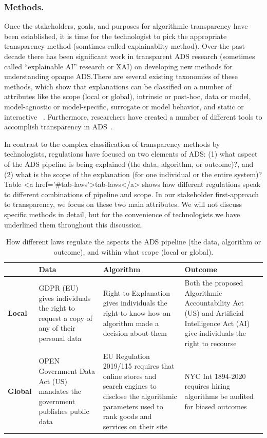 \subsubsection{Methods.}Once the stakeholders, goals, and purposes for algorithmic transparency have been established, it is time for the technologist to pick the appropriate transparency method (somtimes called explainablity method). Over the past decade there has been significant work in transparent ADS research (sometimes called ``explainable AI'' research or XAI) on developing new methods for understanding opaque ADS.There are several existing taxonomies of these methods, which show that explanations can be classified on a number of attributes like the scope (local or global), intrinsic or post-hoc, data or model, model-agnostic or model-specific, surrogate or model behavior, and static or interactive ~\cite{DBLP:journals/jmlr/AryaBCDHHHLLMMP20, molnar2019, DBLP:journals/corr/abs-2012-01805}. Furthermore, researchers have created a number of different tools to accomplish transparency in ADS~\cite{DBLP:conf/nips/LundbergL17, ribeiro2016should, datta2016algorithmic, DBLP:journals/corr/abs-2004-00668, DBLP:journals/corr/abs-2004-00668}.

In contrast to the complex classification of transparency methods by technologists, regulations have focused on two elements of ADS: (1) what aspect of the ADS pipeline is being explained (the data, algorithm, or outcome)?, and (2) what is the scope of the explanation (for one individual or the entire system)? Table <a href='#tab-laws'>tab-laws</a> shows how different regulations speak to different combinations of pipeline and scope. In our stakeholder first-approach to transparency, we focus on these two main attributes. We will not discuss specific methods in detail, but for the convenience of technologists we have underlined them throughout this discussion.

\begin{table}[]
\centering
\begin{tabular}{m{}m{}m{}m{}}
\toprule
 & \bf{Data} & \bf{Algorithm} & \bf{Outcome} \\
\midrule
\multicolumn{1}{l}{\bf{Local}}& GDPR (EU) gives individuals the right to request a copy of any of their personal data & Right to Explanation gives individuals the right to know how an algorithm made a decision about them& Both the proposed Algorithmic Accountability Act (US) and Artificial Intelligence Act (AI) give individuals the right to recourse \\
\multicolumn{1}{l}{\bf{Global}} & OPEN Government Data Act (US) mandates the government publishes public data & EU Regulation 2019/115 requires that online stores and search engines to disclose the algorithmic parameters used to rank goods and services on their site & NYC Int 1894-2020 requires hiring algorithms be audited for biased outcomes \\
\bottomrule
\end{tabular}
\caption{How different laws regulate the aspects the ADS pipeline (the data, algorithm or outcome), and within what scope (local or global).}
\label{tab:laws}
\end{table}

